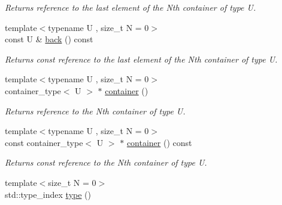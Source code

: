 \begin{DoxyCompactItemize}
\begin{DoxyCompactList}\small\item\em Returns reference to the last element of the Nth container of type U. \end{DoxyCompactList}\item 
\hypertarget{classheterogeneous_1_1heterolist_3_01_t_00_01_types_8_8_8_4_a6706bc31384390e5b7ced094bb78189c}{}{\footnotesize template$<$typename U , size\+\_\+t N = 0$>$ }\\const U \& \hyperlink{classheterogeneous_1_1heterolist_3_01_t_00_01_types_8_8_8_4_a6706bc31384390e5b7ced094bb78189c}{back} () const \label{classheterogeneous_1_1heterolist_3_01_t_00_01_types_8_8_8_4_a6706bc31384390e5b7ced094bb78189c}

\begin{DoxyCompactList}\small\item\em Returns const reference to the last element of the Nth container of type U. \end{DoxyCompactList}\item 
\hypertarget{classheterogeneous_1_1heterolist_3_01_t_00_01_types_8_8_8_4_ab3b3e67c7a47bb7c2fc3cc5e39f1d77f}{}{\footnotesize template$<$typename U , size\+\_\+t N = 0$>$ }\\container\+\_\+type$<$ U $>$ $\ast$ \hyperlink{classheterogeneous_1_1heterolist_3_01_t_00_01_types_8_8_8_4_ab3b3e67c7a47bb7c2fc3cc5e39f1d77f}{container} ()\label{classheterogeneous_1_1heterolist_3_01_t_00_01_types_8_8_8_4_ab3b3e67c7a47bb7c2fc3cc5e39f1d77f}

\begin{DoxyCompactList}\small\item\em Returns reference to the Nth container of type U. \end{DoxyCompactList}\item 
\hypertarget{classheterogeneous_1_1heterolist_3_01_t_00_01_types_8_8_8_4_ae04adf55283450e0b40104581b22d92d}{}{\footnotesize template$<$typename U , size\+\_\+t N = 0$>$ }\\const container\+\_\+type$<$ U $>$ $\ast$ \hyperlink{classheterogeneous_1_1heterolist_3_01_t_00_01_types_8_8_8_4_ae04adf55283450e0b40104581b22d92d}{container} () const \label{classheterogeneous_1_1heterolist_3_01_t_00_01_types_8_8_8_4_ae04adf55283450e0b40104581b22d92d}

\begin{DoxyCompactList}\small\item\em Returns const reference to the Nth container of type U. \end{DoxyCompactList}\item 
\hypertarget{classheterogeneous_1_1heterolist_3_01_t_00_01_types_8_8_8_4_a55ff283db497da736c40b4a89f6a953b}{}{\footnotesize template$<$size\+\_\+t N = 0$>$ }\\std\+::type\+\_\+index \hyperlink{classheterogeneous_1_1heterolist_3_01_t_00_01_types_8_8_8_4_a55ff283db497da736c40b4a89f6a953b}{type} ()\label{classheterogeneous_1_1heterolist_3_01_t_00_01_types_8_8_8_4_a55ff283db497da736c40b4a89f6a953b}


\end{DoxyCompactItemize}
